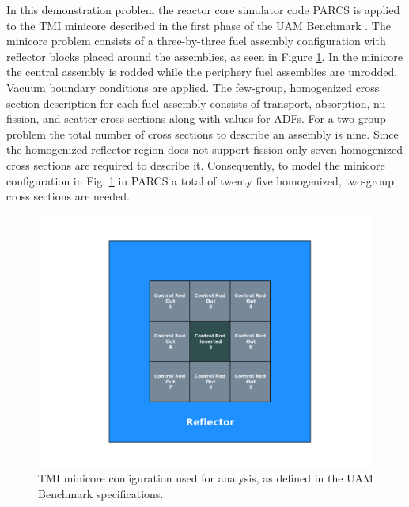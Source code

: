 In this demonstration problem the reactor core simulator code \ac{PARCS} \cite{PARCS} is applied to the \ac{TMI} minicore described in the first phase of the \ac{UAM} Benchmark \cite{UAM_Benchmark}. The minicore problem consists of a three-by-three fuel assembly configuration with reflector blocks placed around the assemblies, as seen in Figure \ref{fig:tmi_minicore}. In the minicore the central assembly is rodded while the periphery fuel assemblies are unrodded. Vacuum boundary conditions are applied. The few-group, homogenized cross section description for each fuel assembly consists of transport, absorption, nu-fission, and scatter cross sections along with values for \ac{ADFs}. For a two-group problem the total number of cross sections to describe an assembly is nine. Since the homogenized reflector region does not support fission only seven homogenized cross sections are required to describe it. Consequently, to model the minicore configuration in Fig. \ref{fig:tmi_minicore} in \ac{PARCS} a total of twenty five homogenized, two-group cross sections are needed.  
\begin{figure}[!htb]
\caption{\label{fig:tmi_minicore}
\ac{TMI} minicore configuration used for analysis, as defined in the \ac{UAM} Benchmark specifications.}
 \begin{center}
  \includegraphics[scale=.75]{./Chapter3/tmi_minicore.pdf}
 \end{center}
\end{figure}  

